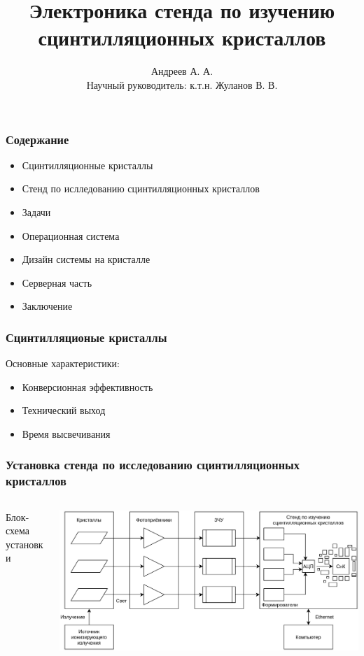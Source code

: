 \documentclass[aspectratio=169]{beamer}
\title{Электроника стенда по изучению сцинтилляционных кристаллов}
\author{Андреев А. А. \\
        Научный руководитель: к.т.н. Жуланов В. В.}
\institute{Новосибирский Государственный Университет}
\begin{document}
\begin{frame}
\titlepage
\end{frame}

\begin{frame}
\frametitle{Содержание}
    \begin{itemize}  
        \item Сцинтилляционные кристаллы
        \item Стенд по ислледованию сцинтилляционных кристаллов
        \item Задачи
        \item Операционная система
        \item Дизайн системы на кристалле
        \item Серверная часть
        \item Заключение
    \end{itemize}
\end{frame}

\begin{frame}
\frametitle{Сцинтилляционые кристаллы}
    Основные характеристики:
    \begin{itemize}  
        \item Конверсионная эффективность
        \item Технический выход
        \item Время высвечивания 
    \end{itemize}
\end{frame}

\begin{frame}
\frametitle{Установка стенда по исследованию сцинтилляционных кристаллов}
    \begin{columns}
        \begin{column}{0.3\textwidth}
            Блок-схема установки
        \end{column}
        \begin{column}{0.7\textwidth}
            \includegraphics[width=\textwidth]{stand.jpg}
        \end{column}
    \end{columns}
\end{frame}
\end{document}
